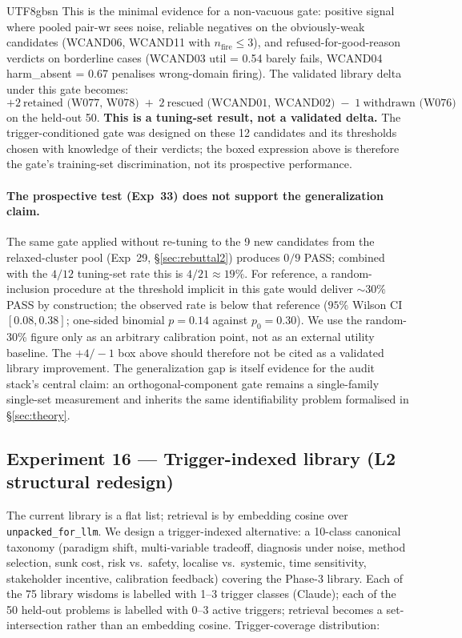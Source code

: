 \documentclass{article}
\begin{document}
\begin{CJK*}{UTF8}{gbsn}
This is the minimal evidence for a non-vacuous gate: positive
signal where pooled pair-wr sees noise, reliable negatives on
the obviously-weak candidates (WCAND06, WCAND11 with \(n_{\text{fire}}
\leq 3\)), and refused-for-good-reason verdicts on borderline
cases (WCAND03 util = 0.54 barely fails, WCAND04 harm\_absent =
0.67 penalises wrong-domain firing). The validated library
delta under this gate becomes:
\[
  \boxed{+2\ \text{retained (W077, W078)} \;+\; 2\ \text{rescued (WCAND01, WCAND02)} \;-\; 1\ \text{withdrawn (W076)}}
\]
on the held-out 50. \textbf{This is a tuning-set result, not a
validated delta.} The trigger-conditioned gate was designed on
these 12 candidates and its thresholds chosen with knowledge of
their verdicts; the boxed expression above is therefore the
gate's training-set discrimination, not its prospective
performance.

\paragraph{The prospective test (Exp~33) does not support the
generalization claim.} The same gate applied without re-tuning
to the 9 new candidates from the relaxed-cluster pool (Exp~29,
\S\ref{sec:rebuttal2}) produces \(0/9\) PASS; combined with the
\(4/12\) tuning-set rate this is \(4/21 \approx 19\%\). For
reference, a random-inclusion procedure at the threshold
implicit in this gate would deliver \(\sim 30\%\) PASS by
construction; the observed rate is below that reference
(\(95\%\) Wilson CI \([0.08, 0.38]\); one-sided binomial
\(p = 0.14\) against \(p_0 = 0.30\)). We use the random-30\%
figure only as an arbitrary calibration point, not as an
external utility baseline. The \(+4/-1\) box above should
therefore not be cited as a validated library improvement. The generalization
gap is itself evidence for the audit stack's central claim:
an orthogonal-component gate remains a single-family
single-set measurement and inherits the same identifiability
problem formalised in \S\ref{sec:theory}.

\subsection{Experiment 16 — Trigger-indexed library (L2
structural redesign)}
\label{sec:l2}

The current library is a flat list; retrieval is by embedding
cosine over \texttt{unpacked\_for\_llm}. We design a
trigger-indexed alternative: a 10-class canonical taxonomy
(paradigm shift, multi-variable tradeoff, diagnosis under noise,
method selection, sunk cost, risk vs.\ safety, localise vs.\
systemic, time sensitivity, stakeholder incentive, calibration
feedback) covering the Phase-3 library. Each of the 75
library wisdoms is labelled with 1–3 trigger classes (Claude);
each of the 50 held-out problems is labelled with 0–3 active
triggers; retrieval becomes a set-intersection rather than an
embedding cosine. Trigger-coverage distribution:


\end{CJK*}
\end{document}
